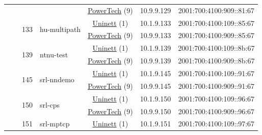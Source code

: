 \begin{small}
\begin{center}
\begin{longtable}{|c|c|c|c|c|c|c|c|}
  &  &  &  & \multicolumn{2}{|c|}{\tiny{\href{http://www.powertech.no}{PowerTech} (9)}} & \tiny{10.9.9.129} & \tiny{2001:700:4100:909::81:67} \\* \cline{3-3}\cline{4-4}\cline{5-5}\cline{6-6}\cline{7-7}\cline{8-8}
  &  & \multirow{2}{*}{\tiny{133}} & \multicolumn{1}{|l|}{\multirow{2}{*}{\tiny{hu-multipath}}} & \multicolumn{2}{|c|}{\tiny{\href{https://www.uninett.no}{Uninett} (1)}} & \tiny{10.1.9.133} & \tiny{2001:700:4100:109::85:67} \\* \cline{5-5}\cline{6-6}\cline{7-7}\cline{8-8}
  &  &  &  & \multicolumn{2}{|c|}{\tiny{\href{http://www.powertech.no}{PowerTech} (9)}} & \tiny{10.9.9.133} & \tiny{2001:700:4100:909::85:67} \\* \cline{3-3}\cline{4-4}\cline{5-5}\cline{6-6}\cline{7-7}\cline{8-8}
  &  & \multirow{2}{*}{\tiny{139}} & \multicolumn{1}{|l|}{\multirow{2}{*}{\tiny{ntnu-test}}} & \multicolumn{2}{|c|}{\tiny{\href{https://www.uninett.no}{Uninett} (1)}} & \tiny{10.1.9.139} & \tiny{2001:700:4100:109::8b:67} \\* \cline{5-5}\cline{6-6}\cline{7-7}\cline{8-8}
  &  &  &  & \multicolumn{2}{|c|}{\tiny{\href{http://www.powertech.no}{PowerTech} (9)}} & \tiny{10.9.9.139} & \tiny{2001:700:4100:909::8b:67} \\* \cline{3-3}\cline{4-4}\cline{5-5}\cline{6-6}\cline{7-7}\cline{8-8}
  &  & \multirow{2}{*}{\tiny{145}} & \multicolumn{1}{|l|}{\multirow{2}{*}{\tiny{srl-nndemo}}} & \multicolumn{2}{|c|}{\tiny{\href{https://www.uninett.no}{Uninett} (1)}} & \tiny{10.1.9.145} & \tiny{2001:700:4100:109::91:67} \\* \cline{5-5}\cline{6-6}\cline{7-7}\cline{8-8}
  &  &  &  & \multicolumn{2}{|c|}{\tiny{\href{http://www.powertech.no}{PowerTech} (9)}} & \tiny{10.9.9.145} & \tiny{2001:700:4100:909::91:67} \\* \cline{3-3}\cline{4-4}\cline{5-5}\cline{6-6}\cline{7-7}\cline{8-8}
  &  & \multirow{2}{*}{\tiny{150}} & \multicolumn{1}{|l|}{\multirow{2}{*}{\tiny{srl-cps}}} & \multicolumn{2}{|c|}{\tiny{\href{https://www.uninett.no}{Uninett} (1)}} & \tiny{10.1.9.150} & \tiny{2001:700:4100:109::96:67} \\* \cline{5-5}\cline{6-6}\cline{7-7}\cline{8-8}
  &  &  &  & \multicolumn{2}{|c|}{\tiny{\href{http://www.powertech.no}{PowerTech} (9)}} & \tiny{10.9.9.150} & \tiny{2001:700:4100:909::96:67} \\* \cline{3-3}\cline{4-4}\cline{5-5}\cline{6-6}\cline{7-7}\cline{8-8}
  &  & \multirow{2}{*}{\tiny{151}} & \multicolumn{1}{|l|}{\multirow{2}{*}{\tiny{srl-mptcp}}} & \multicolumn{2}{|c|}{\tiny{\href{https://www.uninett.no}{Uninett} (1)}} & \tiny{10.1.9.151} & \tiny{2001:700:4100:109::97:67} \\* \cline{5-5}\cline{6-6}\cline{7-7}\cline{8-8}

\end{longtable}
\end{center}
\end{small}
